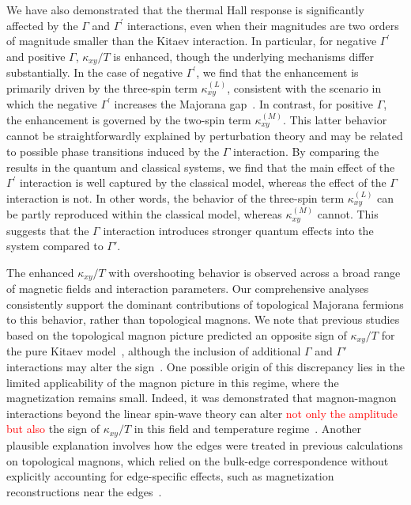 \documentclass[twocolumn,superscriptaddress,showpacs, longbibliography, aps, prx]{revtex4-2}
\newcommand{\red}[1]{\textcolor{red}{#1}}
\begin{document}
We have also demonstrated that the thermal Hall response is significantly affected by 
the $\Gamma$ and $\Gamma^{\prime}$ interactions, even when their magnitudes are two orders of magnitude smaller than the Kitaev interaction. 
In particular, for negative $\Gamma^{\prime}$ and positive $\Gamma$, $\kappa_{xy}/T$ is enhanced, though the underlying mechanisms differ substantially.
In the case of negative $\Gamma^{\prime}$, we find that the enhancement is primarily driven by the three-spin term $\kappa_{xy}^{(L)}$, consistent with the scenario in which the negative $\Gamma^{\prime}$ increases the Majorana gap~\cite{TakikawaF2020}.
In contrast, for positive $\Gamma$, the enhancement is governed by the two-spin term $\kappa_{xy}^{(M)}$.
This latter behavior cannot be straightforwardly explained by perturbation theory and may be related to possible phase transitions induced by the $\Gamma$ interaction.
By comparing the results in the quantum and classical systems, we find that the main effect of the $\Gamma^{\prime}$ interaction is well captured by the classical model, 
whereas the effect of the $\Gamma$ interaction is not.
In other words, the behavior of the three-spin term $\kappa_{xy}^{(L)}$ 
can be partly reproduced within the classical model, whereas $\kappa_{xy}^{(M)}$ cannot.
This suggests that the $\Gamma$ interaction introduces stronger quantum effects into the system compared to $\Gamma'$.

The enhanced $\kappa_{xy}/T$ with overshooting behavior is observed across a broad range of magnetic fields and interaction parameters. 
Our comprehensive analyses consistently support the dominant contributions of topological Majorana fermions to this behavior, rather than topological magnons. 
We note that previous studies based on the topological magnon picture predicted an opposite sign of $\kappa_{xy}/T$ for the pure Kitaev model~\cite{McClartyDGRPMP2018,Koyama2024}, although the inclusion of additional $\Gamma$ and $\Gamma'$ interactions may alter the sign~\cite{ChernZK2021,ZhangCK2021}. 
One possible origin of this discrepancy lies in the limited applicability of the magnon picture in this regime, where the magnetization remains small. 
Indeed, it was demonstrated that magnon-magnon interactions beyond the linear spin-wave theory can alter \red{not only the amplitude but also} the sign of $\kappa_{xy}/T$ in this field and temperature regime~\cite{Koyama2024}. 
Another plausible explanation involves how the edges were treated in previous calculations on topological magnons, which relied on the bulk-edge correspondence without explicitly accounting for edge-specific effects, such as magnetization reconstructions near the edges~\cite{KoyamaN2023,HabelMWK2024}. 
\end{document}
